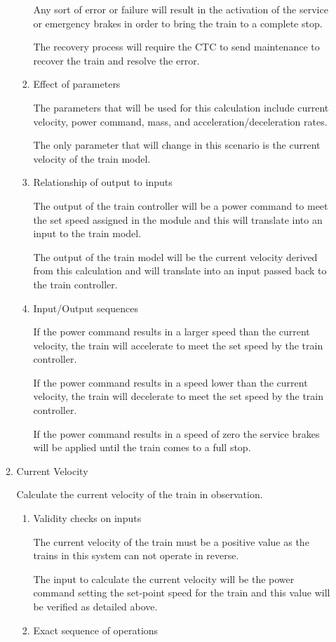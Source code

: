 \documentclass[11pt]{article}
\begin{document}
\begin{enumerate}
\begin{enumerate}
\begin{enumerate}
Any sort of error or failure will result in the activation of the service or emergency brakes in order to bring the train to a complete stop. 

The recovery process will require the CTC to send maintenance to recover the train and resolve the error.
\item Effect of parameters
\label{sec-3-1-4-1-1-6}

The parameters that will be used for this calculation include current velocity, power command, mass, and acceleration/deceleration rates.

The only parameter that will change in this scenario is the current velocity of the train model.
\item Relationship of output to inputs
\label{sec-3-1-4-1-1-7}

The output of the train controller will be a power command to meet the set speed assigned in the module and this will translate into an input to the train model.

The output of the train model will be the current velocity derived from this calculation and will translate into an input passed back to the train controller.
\item Input/Output sequences
\label{sec-3-1-4-1-1-8}

If the power command results in a larger speed than the current velocity, the train will accelerate to meet the set speed by the train controller.

If the power command results in a speed lower than the current velocity, the train will decelerate to meet the set speed by the train controller.

If the power command results in a speed of zero the service brakes will be applied until the train comes to a full stop.
\end{enumerate}
\item Current Velocity
\label{sec-3-1-4-1-2}

Calculate the current velocity of the train in observation.
\begin{enumerate}
\item Validity checks on inputs
\label{sec-3-1-4-1-2-1}

The current velocity of the train must be a positive value as the trains in this system can not operate in reverse.

The input to calculate the current velocity will be the power command setting the set-point speed for the train and this value will be verified as detailed above.
\item Exact sequence of operations
\label{sec-3-1-4-1-2-2}


\end{enumerate}
\end{enumerate}
\end{enumerate}
\end{document}
